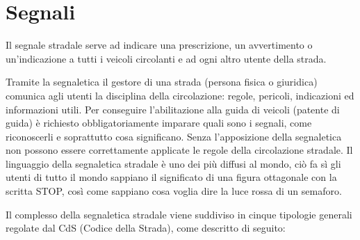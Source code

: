 \section{Segnali}
Il segnale stradale serve ad indicare una prescrizione, un avvertimento o un'indicazione a tutti i veicoli circolanti e ad ogni altro utente della strada.

Tramite la segnaletica il gestore di una strada (persona fisica o giuridica) comunica agli utenti la disciplina della circolazione: regole, pericoli, indicazioni ed informazioni utili. Per conseguire l'abilitazione alla guida di veicoli (patente di guida) è richiesto obbligatoriamente imparare quali sono i segnali, come riconoscerli e soprattutto cosa significano. Senza l'apposizione della segnaletica non possono essere correttamente applicate le regole della circolazione stradale. Il linguaggio della segnaletica stradale è uno dei più diffusi al mondo, ciò fa sì gli utenti di tutto il mondo sappiano il significato di una figura ottagonale con la scritta STOP, così come sappiano cosa voglia dire la luce rossa di un semaforo.

Il complesso della segnaletica stradale viene suddiviso in cinque tipologie generali\cite{CdsTitIICapoII} regolate dal CdS (Codice della Strada), come descritto di seguito:

